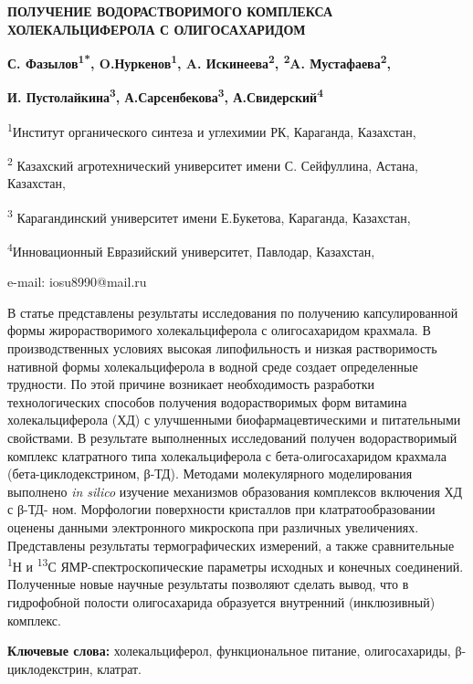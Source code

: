 \begin{center}
{\large\bfseries ПОЛУЧЕНИЕ ВОДОРАСТВОРИМОГО КОМПЛЕКСА ХОЛЕКАЛЬЦИФЕРОЛА С
ОЛИГОСАХАРИДОМ}

\vspace{1em}
{\bfseries С. Фазылов\textsuperscript{1*}, O.Нуркенов\textsuperscript{1},
A. Искинеева\textsuperscript{2}, \textsuperscript{2}A.
Мустафаева\textsuperscript{2},}

{\bfseries И. Пустолайкина\textsuperscript{3},
А.Сарсенбекова\textsuperscript{3}, А.Свидерский\textsuperscript{4}}

\textsuperscript{1}Институт органического синтеза и углехимии РК,
Караганда, Казахстан,

\textsuperscript{2} Казахский агротехнический университет имени С.
Сейфуллина, Астана, Казахстан,

\textsuperscript{3} Карагандинский университет имени Е.Букетова,
Караганда, Казахстан,

\textsuperscript{4}Инновационный Евразийский университет, Павлодар,
Казахстан,

e-mail: iosu8990@mail.ru
\end{center}

В статье представлены результаты исследования по получению
капсулированной формы жирорастворимого холекальциферола с олигосахаридом
крахмала. В производственных условиях высокая липофильность и низкая
растворимость нативной формы холекальциферола в водной среде создает
определенные трудности. По этой причине возникает необходимость
разработки технологических способов получения водорастворимых форм
витамина холекальциферола (ХД) с улучшенными биофармацевтическими и
питательными свойствами. В результате выполненных исследований получен
водорастворимый комплекс клатратного типа холекальциферола с
бета-олигосахаридом крахмала (бета-циклодекстрином, β-ТД). Методами
молекулярного моделирования выполнено \emph{in silico} изучение
механизмов образования комплексов включения ХД с β-ТД- ном. Морфологии
поверхности кристаллов при клатратообразовании оценены данными
электронного микроскопа при различных увеличениях. Представлены
результаты термографических измерений, а также сравнительные
\textsuperscript{1}Н и \textsuperscript{13}С ЯМР-спектроскопические
параметры исходных и конечных соединений. Полученные новые научные
результаты позволяют сделать вывод, что в гидрофобной полости
олигосахарида образуется внутренний (инклюзивный) комплекс.

{\bfseries Ключевые слова:} холекальциферол, функциональное питание,
олигосахариды, β-циклодекстрин, клатрат.

